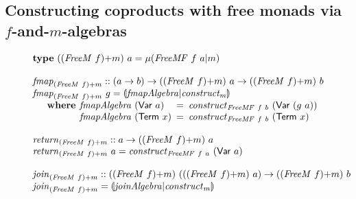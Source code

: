 \documentclass{jfp1}
\newcommand{\eFold}[2]{\llparenthesis #1|#2 \rrparenthesis}
\newcommand{\kw}[1]{\textbf{#1}}
\begin{document}
\subsection{Constructing coproducts with free monads via $f$-and-$m$-algebras}
\label{sec:construct-coproducts}

\begin{figure}
  \centering
  \begin{displaymath}
    \begin{array}{@{}l}
      \kw{type}~(\cprd{(\mathit{FreeM}~f)}{m})~a = \mu(\mathit{FreeMF}~f~a|m) \\
      \\
      \begin{array}{@{}l}
        \mathit{fmap}_{\cprd{(\mathit{FreeM}~f)}{m}} :: (a \to b) \to (\cprd{(\mathit{FreeM}~f)}{m})~a \to (\cprd{(\mathit{FreeM}~f)}{m})~b \\
        \mathit{fmap}_{\cprd{(\mathit{FreeM}~f)}{m}}~g = \eFold{\mathit{fmapAlgebra}}{\mathit{construct_m}} \\
        \quad\begin{array}{r@{\hspace{0.4em}}l@{\hspace{0.5em}}c@{\hspace{0.5em}}l}
          \kw{where} & \mathit{fmapAlgebra}~(\mathsf{Var}~a) &=& \mathit{construct}_{\mathit{FreeMF}~f~b}~(\mathsf{Var}~(g~a)) \\
          & \mathit{fmapAlgebra}~(\mathsf{Term}~x) &=& \mathit{construct}_{\mathit{FreeMF}~f~b}~(\mathsf{Term}~x)
        \end{array}
      \end{array} \\
      \\
      \begin{array}{@{}l}
        \mathit{return}_{\cprd{(\mathit{FreeM}~f)}{m}} :: a \to (\cprd{(\mathit{FreeM}~f)}{m})~a \\
        \mathit{return}_{\cprd{(\mathit{FreeM}~f)}{m}}~a = \mathit{construct}_{\mathit{FreeMF}~f~a}~(\mathsf{Var}~a)
      \end{array} \\
      \\
      \begin{array}{@{}l}
        \mathit{join}_{\cprd{(\mathit{FreeM}~f)}{m}} :: (\cprd{(\mathit{FreeM}~f)}{m})~((\cprd{(\mathit{FreeM}~f)}{m})~a) \to (\cprd{(\mathit{FreeM}~f)}{m})~b \\
        \mathit{join}_{\cprd{(\mathit{FreeM}~f)}{m}} = \eFold{\mathit{joinAlgebra}}{\mathit{construct}_m} \\

\end{array}
\end{array}
\end{displaymath}
\end{figure}
\end{document}
